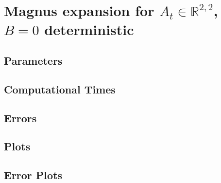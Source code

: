 \section{Magnus expansion for $A_t\in \mathbb{R}^{2,2}$, $B=0$ deterministic}
	
\subsection{Parameters}
	
\subsection{Computational Times}
	
\subsection{Errors}
	
\subsection{Plots}
	
\subsection{Error Plots}
	
